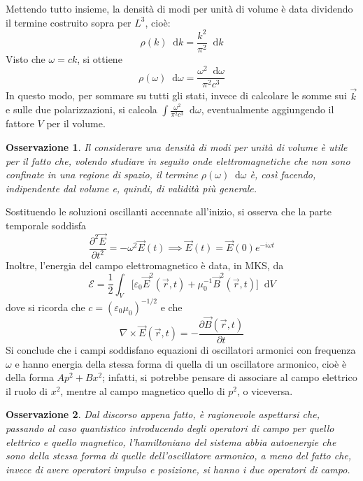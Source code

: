 \documentclass[11pt, a4paper]{scrartcl}
\theoremstyle{style}
\newtheorem{osservazione}{Osservazione}[section]
\newcommand{\dd}{\mathop{}\!\mathrm{d}}
\numberwithin{equation}{subsection}
\begin{document}
Mettendo tutto insieme, la densit\`a di modi per unit\`a di volume \`e data dividendo il termine costruito sopra per $L^3$, cio\`e:
\begin{equation*}
	\rho (k)\dd k= \frac{ k^2 }{\pi^2}\dd k
\end{equation*}
Visto che $\omega = ck$, si ottiene 
\begin{equation}
	\rho (\omega ) \dd \omega = \frac{\omega ^2 \dd \omega}{\pi ^2 c^3}
\end{equation}
In questo modo, per sommare su tutti gli stati, invece di calcolare le somme sui $\vec{k}$ e sulle due polarizzazioni, si calcola $\int \frac{\omega^2}{ \pi^2 c^3} \dd \omega$, eventualmente aggiungendo il fattore $V$ per il volume.
\begin{osservazione}
Il considerare una densit\`a di modi per unit\`a di volume \`e utile per il fatto che, volendo studiare in seguito onde elettromagnetiche che non sono confinate in una regione di spazio, il termine $\rho (\omega ) \dd \omega$ \`e, cos\`i facendo, indipendente dal volume e, quindi, di validit\`a pi\`u generale.
\end{osservazione}
Sostituendo le soluzioni oscillanti accennate all'inizio, si osserva che la parte temporale soddisfa 
\[
\frac{\partial ^2 \vec{E}}{\partial t^2}  = - \omega ^ 2 \vec{E}(t) \implies \vec{E}(t) = \vec{E}(0) e^{-i\omega t}
\] 
Inoltre, l'energia del campo elettromagnetico \`e data, in MKS, da 
\begin{equation}
	\mathcal{E}  = \frac{1}{2} \int _V \Big[\varepsilon _0 \vec{E}^2(\vec{r},t) + \mu _0 ^{-1} \vec{B}^2 (\vec{r},t)\Big] \dd V
\end{equation}
dove si ricorda che $c = (\varepsilon _0 \mu _0)^{-1 / 2}$ e che
\[
	\nabla \times \vec{E}(\vec{r},t) = - \frac{\partial \vec{B}(\vec{r},t)}{\partial t} 
\] 
Si conclude che i campi soddisfano equazioni di oscillatori armonici con frequenza $\omega $ e hanno energia della stessa forma di quella di un oscillatore armonico, cio\`e \`e della forma $A p^2 + Bx^2$; infatti, si potrebbe pensare di associare al campo elettrico il ruolo di $x^2$, mentre al campo magnetico quello di $p^2$, o viceversa.
\begin{osservazione}
Dal discorso appena fatto, \`e ragionevole aspettarsi che, passando al caso quantistico introducendo degli operatori di campo per quello elettrico e quello magnetico, l'hamiltoniano del sistema abbia autoenergie che sono della stessa forma di quelle dell'oscillatore armonico, a meno del fatto che, invece di avere operatori impulso e posizione, si hanno i due operatori di campo.
\end{osservazione}
\end{document}
